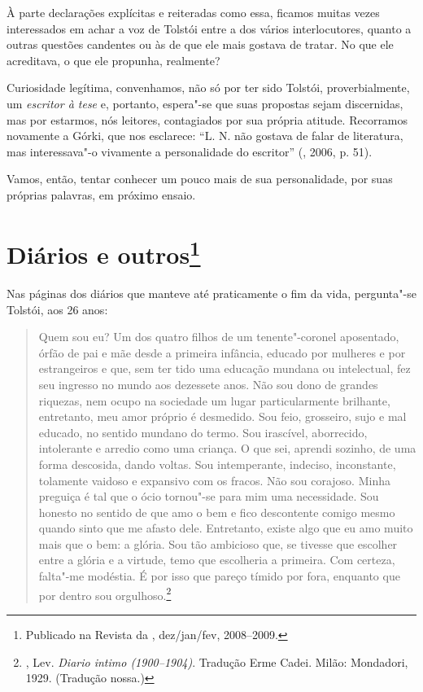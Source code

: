 À parte declarações explícitas e reiteradas como essa, ficamos muitas
vezes interessados em achar a voz de Tolstói entre a dos
vários interlocutores, quanto a outras questões candentes ou às de que
ele mais gostava de tratar. No que ele acreditava, o que ele propunha,
realmente?

Curiosidade legítima, convenhamos, não só por ter sido Tolstói,
proverbialmente, um \emph{escritor à tese} e, portanto, espera"-se que suas
propostas sejam discernidas, mas por estarmos, nós leitores,
contagiados por sua própria atitude. Recorramos novamente a
Górki, que nos esclarece: ``L. N. não gostava
de falar de literatura, mas interessava"-o vivamente a personalidade do
escritor'' (, 2006, p. 51).

Vamos, então, tentar conhecer um pouco mais de sua personalidade, por
suas próprias palavras, em próximo ensaio.

\chapter{Diários e outros\footnote{Publicado na Revista da {}, dez/jan/fev, 2008--2009.}}

Nas páginas dos diários que manteve até praticamente o fim da vida,
pergunta"-se Tolstói, aos 26 anos:

\begin{quotation}
Quem sou eu? Um dos quatro filhos de um
tenente"-coronel aposentado, órfão de pai e mãe desde a primeira
infância, educado por mulheres e por estrangeiros e que, sem ter tido
uma educação mundana ou intelectual, fez seu ingresso no mundo aos
dezessete anos. Não sou dono de grandes riquezas, nem ocupo na sociedade
um lugar particularmente brilhante, entretanto, meu amor próprio é
desmedido. Sou feio, grosseiro, sujo e mal educado, no sentido mundano
do termo. Sou irascível, aborrecido, intolerante e arredio como uma
criança. O que sei, aprendi sozinho, de uma forma descosida, dando
voltas. Sou intemperante, indeciso, inconstante, tolamente vaidoso e
expansivo com os fracos. Não sou corajoso. Minha preguiça é tal que o
ócio tornou"-se para mim uma necessidade. Sou honesto no sentido de que
amo o bem e fico descontente comigo mesmo quando sinto que me afasto
dele. Entretanto, existe algo que eu amo muito mais que o bem: a glória.
Sou tão ambicioso que, se tivesse que escolher entre a glória e a
virtude, temo que escolheria a primeira. Com certeza, falta"-me modéstia.
É por isso que pareço tímido por fora, enquanto que por dentro sou
orgulhoso.\footnote{, Lev. \emph{Diario intimo (1900--1904)}. Tradução Erme Cadei. Milão: Mondadori, 1929. (Tradução nossa.)}
\end{quotation}

